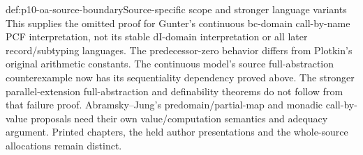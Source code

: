 \begin{proofboundary}{def:p10-oa-source-boundary}{Source-specific scope and stronger language variants}
This supplies the omitted proof for Gunter's continuous bc-domain
call-by-name PCF interpretation, not its stable dI-domain interpretation
or all later record/subtyping languages. The predecessor-zero behavior
differs from Plotkin's original arithmetic constants. The continuous
model's source full-abstraction counterexample now has its sequentiality
dependency proved above. The stronger parallel-extension full-abstraction
and definability theorems do not follow from that failure proof.
Abramsky--Jung's predomain/partial-map and monadic
call-by-value proposals need their own value/computation semantics and
adequacy argument. Printed chapters, the held author presentations and
the whole-source allocations remain distinct.
\end{proofboundary}
